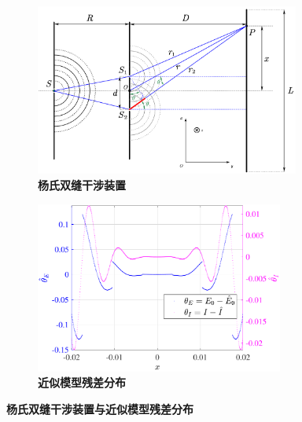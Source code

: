 \documentclass[UTF8]{report}
\theoremstyle{MyLineTheoremStyle} %
\theoremstyle{MyBlockTheoremStyle} %
\theoremstyle{MySubsubsectionStyle} %
\begin{document}
\begin{figure}[H]\centering
    \begin{subfigure}[t]{0.52\columnwidth}\centering
        \includegraphics[height=160pt]{assets/3/杨双.pdf}
        \caption{\bfseries 杨氏双缝干涉装置 }
    \end{subfigure}\begin{subfigure}[t]{0.48\columnwidth}\centering
        \includegraphics[height=160pt]{assets/3/杨残差.pdf}
        \caption{\bfseries 近似模型残差分布 }
    \end{subfigure}
    \caption{\bfseries 杨氏双缝干涉装置与近似模型残差分布 }\label{杨氏双缝干涉装置}
\end{figure}
\end{document}
